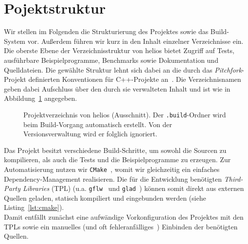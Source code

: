 \section{Pojektstruktur}
Wir stellen im Folgenden die Strukturierung des Projektes sowie das Build-System vor.
Außerdem führen wir kurz in den Inhalt einzelner Verzeichnisse ein.\\

Die oberste Ebene der Verzeichnisstruktur von helios bietet Zugriff auf Tests, ausführbare Beispielprogramme, Benchmarks sowie Dokumentation und Quelldateien.
Die gewählte Struktur lehnt sich dabei an die durch das \textit{Pitchfork}-Projekt definierten Konventionen für C++-Projekte an~\cite[]{Pitchfork}.
Die Verzeichnisnamen geben dabei Aufschluss über den durch sie verwalteten Inhalt und ist wie in Abbildung~\ref{fig:verzeichnisstruktur} angegeben.\\

\begin{figure}[htbp]
    \setlength{\DTbaselineskip}{18pt}
    \caption{Projektverzeichnis von helios (Ausschnitt). Der \texttt{.build}-Ordner wird beim Build-Vorgang automatisch erstellt. Von der Versionsverwaltung wird er folglich ignoriert.}
    \label{fig:verzeichnisstruktur}
\end{figure}

Das Projekt besitzt verschiedene Build-Schritte, um sowohl die Sourcen zu kompilieren, als auch die Tests und die Beispielprogramme zu erzeugen.
Zur Automatisierung nutzen wir \texttt{CMake}~\cite[]{CMake}, womit wir gleichzeitig ein einfaches Dependency-Management realisieren.
Die für die Entwicklung benötigten \textit{Third-Party Libraries} (TPL) (u.a. \texttt{gflw}~\cite[]{glfwHomepage} und \texttt{glad}~\cite[]{gladgithub}) können somit direkt aus externen Quellen geladen, statisch kompiliert und eingebunden werden (siehe Listing~\ref{lst:cmake}).\\

Damit entfällt zunächst eine aufwändige Vorkonfiguration des Projektes mit den TPLs sowie ein manuelles (und oft fehleranfälliges~\cite[]{FG22}) Einbinden der benötigten Quellen.

